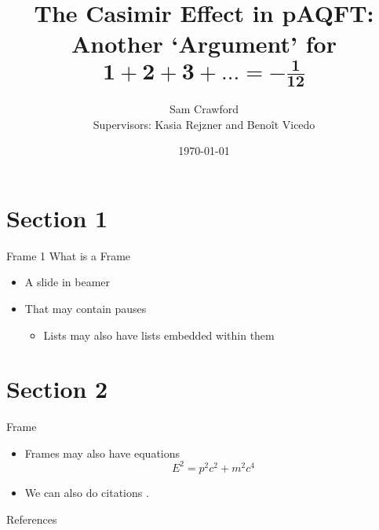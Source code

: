 \documentclass[pdf, fleqn, compress]{beamer}
\title[Graduate Research Symposium 2020]{The Casimir Effect in pAQFT: \\
\large Another `Argument' for $\boldsymbol{1 + 2 + 3 + ... = - \frac{1}{12}}$}
\author[Sam Crawford]{Sam Crawford\\
Supervisors: Kasia Rejzner and Beno\^it Vicedo}
\institute{Institution (Probably York)}
\date{\today}
\begin{document}
\begin{nonavigation}

\begin{frame}
    \titlepage
\end{frame}

\end{nonavigation}


\section{Section 1}

\begin{frame}{Frame 1}
	What is a Frame
	\begin{itemize}
		\item A slide in beamer
		\pause
		\item That may contain pauses
		\begin{itemize}
			\item Lists may also have lists embedded within them
		\end{itemize}
	\end{itemize}
\end{frame}

\section{Section 2}

\begin{frame}{Frame}
	\begin{itemize}
		\item Frames may also have equations
		\begin{equation}
			E^2 = p^2 c^2 + m^2 c^4
		\end{equation}
		\item We can also do citations \cite{knuth1986computers}.
	\end{itemize}
\end{frame}

\begin{nonavigation}
\appendix

\begin{frame}{References}
	\fontsize{8pt}{7.2}\selectfont
	
	
\end{frame}

\end{nonavigation}
\end{document}
